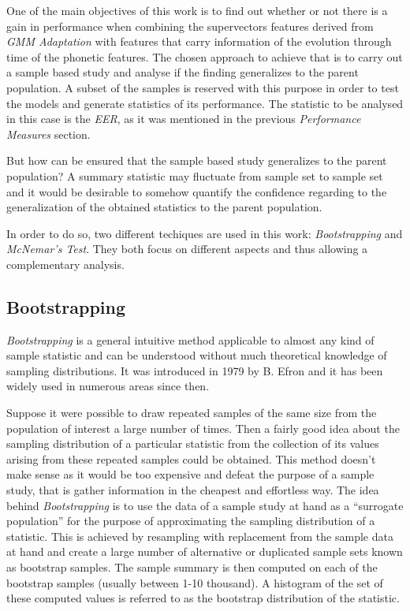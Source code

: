 One of the main objectives of this work is to find out whether or not there is a gain in performance
when combining the supervectors features derived from \textit{GMM Adaptation} with features
that carry information of the evolution through time of the phonetic features.
The chosen approach to achieve that is to carry out a sample based study and analyse if the
finding generalizes to the parent population. A subset of the samples
is reserved with this purpose in order to test the models and generate statistics of its
performance. The statistic to be analysed in this case
is the \textit{EER}, as it was mentioned in the previous \textit{Performance
Measures} section.

But how can be ensured that the sample based study generalizes to the parent population?
A summary statistic may fluctuate from sample set to sample set and it would be
desirable to somehow quantify the confidence regarding to the generalization of the
obtained statistics to the parent population.

In order to do so, two different techiques are used in this work: \textit{Bootstrapping} and \\
\textit{McNemar's Test}. They both focus on different aspects and thus allowing a
complementary analysis.

\subsection{Bootstrapping}

\cite{bootstrapping} \textit{Bootstrapping} is a general intuitive method applicable
to almost any kind of sample statistic and can be understood without much theoretical
knowledge of sampling distributions. It was introduced in 1979 by B. Efron and it has
been widely used in numerous areas since then.

Suppose it were possible to draw repeated samples
of the same size from the population of interest a large number of times. Then
a fairly good idea about the sampling distribution of a particular statistic from
the collection of its values arising from these repeated samples could be obtained.
This method doesn't make sense as it would be too expensive and defeat the purpose of a
sample study, that is gather information in the cheapest and effortless way.
The idea behind \textit{Bootstrapping} is to use the data of a sample study at hand as a
``surrogate population'' for the purpose of approximating the sampling distribution of
a statistic. This is achieved by resampling with replacement from the sample data
at hand and create a large number of alternative or duplicated sample sets known as
bootstrap samples. The sample summary is then computed on each of the bootstrap
samples (usually between 1-10 thousand). A histogram of the set of these computed
values is referred to as the bootstrap distribution of the statistic.

